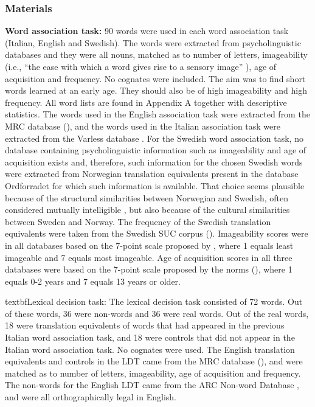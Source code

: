 \documentclass[output=paper,colorlinks,citecolor=brown,nonflat]{langsci/langscibook}
\begin{document}
\subsubsection{Materials}\label{sec:gudmundson:2.2.3}

\textbf{Word association task:} 90 words were used in each word association task (Italian, English and Swedish). The words were extracted from psycholinguistic databases and they were all nouns, matched as to number of letters, imageability (i.e., “the ease with which a word gives rise to a sensory image” \citealt[73]{BirdEtAl2001}), age of acquisition and frequency. No cognates were included. The aim was to find short words learned at an early age. They should also be of high imageability and high frequency. All word lists are found in Appendix A together with descriptive statistics. The words used in the English association task were extracted from the MRC database (\citealt{Coltheart1981, Wilson1988}), and the words used in the Italian association task were extracted from the Varless database \citep{BuraniEtAl2001}. For the Swedish word association task, no database containing psycholinguistic information such as imageability and age of acquisition exists and, therefore, such information for the chosen Swedish words were extracted from Norwegian translation equivalents present in the database Ordforradet \citep{LindEtAl2013} for which such information is available. That choice seems plausible because of the structural similarities between Norwegian and Swedish, often considered mutually intelligible \citep{Gooskens2010}, but also because of the cultural similarities between Sweden and Norway. The frequency of the Swedish translation equivalents were taken from the Swedish SUC corpus (\citealt{Gustafson-CapkováHartmann2006}). Imageability scores were in all databases based on the 7-point scale proposed by \citet{PaivioEtAl1968}, where 1 equals least imageable and 7 equals most imageable. Age of acquisition scores in all three databases were based on the 7-point scale proposed by the \citeauthor{GilhoolyLogie1980} norms (\citeyear{GilhoolyLogie1980}), where 1 equals 0-2 years and 7 equals 13 years or older.

textbf{Lexical decision task:} The lexical decision task consisted of 72 words. Out of these words, 36 were non-words and 36 were real words. Out of the real words, 18 were translation equivalents of words that had appeared in the previous Italian word association task, and 18 were controls that did not appear in the Italian word association task. No cognates were used. The English translation equivalents and controls in the LDT came from the MRC database (\citealt{Coltheart1981, Wilson1988}), and were matched as to number of letters, imageability, age of acquisition and frequency. The non-words for the English LDT came from the ARC Non-word Database \citep{RastleEtAl2002}, and were all orthographically legal in English.
\end{document}
